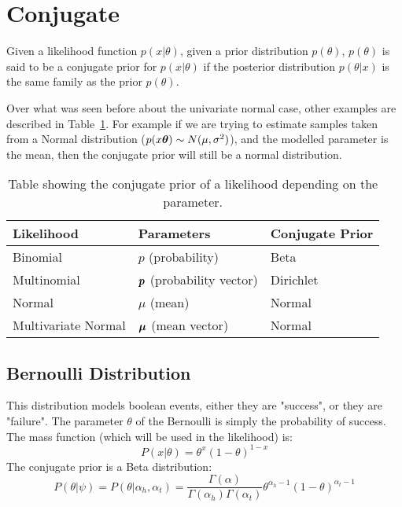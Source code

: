 \section{Conjugate}
\begin{definition}
Given a likelihood function $p(x\vert\theta)$, given a prior distribution $p(\theta)$, $p(\theta)$ is said to be a conjugate prior for $p(x\vert\theta)$ if the posterior distribution $p(\theta\vert x)$ is the same family as the prior $p(\theta)$. 
\end{definition}
Over what was seen before about the univariate normal case, other examples are described in Table~\ref{tab:conjugateDistributions}. For example if we are trying to estimate samples taken from a Normal distribution ($p(x\bm{\theta})\sim N(\mu, \sigma^2)$), and the modelled parameter is the mean, then the conjugate prior will still be a normal distribution. 
\begin{table}[htp]
	\centering
	\begin{tabular}{lll}
		Likelihood&Parameters&Conjugate Prior\\
		\hline
		Binomial&$p$ (probability)&Beta\\
		Multinomial&$\bm{p}$ (probability vector)&Dirichlet\\
		Normal&$\mu$ (mean)&Normal\\
		Multivariate Normal&$\bm{\mu}$ (mean vector)&Normal\\
	\end{tabular}
	\caption{Table showing the conjugate prior of a likelihood depending on the parameter.}
	\label{tab:conjugateDistributions}
\end{table}
%
%
\subsection{Bernoulli Distribution}
This distribution models boolean events, either they are "success", or they are "failure". The parameter $\theta$ of the Bernoulli is simply the probability of success. The mass function (which will be used in the likelihood) is:
\[
	P(x\vert\theta)=\theta^x(1-\theta)^{1-x}
\]
The conjugate prior is a Beta distribution:
\[
	P(\theta\vert\psi)=P(\theta\vert\alpha_h, \alpha_t)=\frac{\Gamma(\alpha)}{\Gamma(\alpha_h)\Gamma(\alpha_t)}\theta^{\alpha_h-1}(1-\theta)^{\alpha_t-1}
\]
%
%
